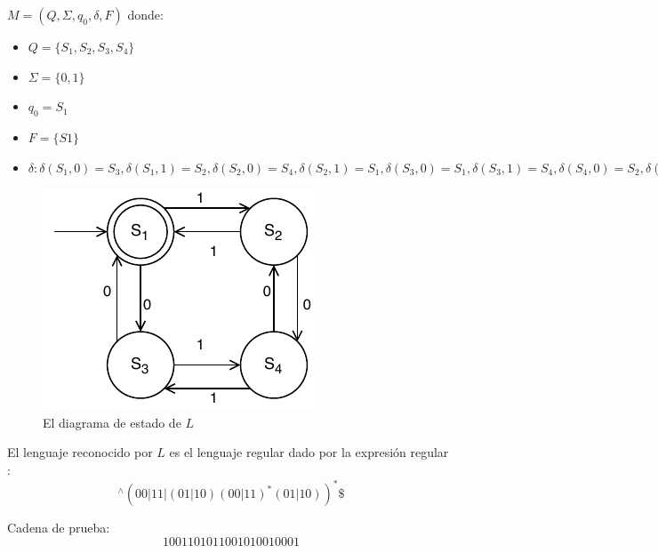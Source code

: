 $M = (Q, \Sigma, q_{0}, \delta, F)$ donde:
\begin{itemize}
	\item $Q = \{S_1, S_2, S_3, S_4 \}$
	\item $\Sigma = \{ 0, 1 \}$
	\item $q_0 = S_1$
	\item $F = \{ S1 \}$
	\item $\delta:  
			\delta(S_1, 0) = S_3, 
			\delta(S_1, 1) = S_2,
			\delta(S_2, 0) = S_4,
			\delta(S_2, 1) = S_1,
			\delta(S_3, 0) = S_1,
			\delta(S_3, 1) = S_4,
			\delta(S_4, 0) = S_2,
			\delta(S_4, 1) = S_3
		$
\end{itemize}

\begin{figure}[H]
	\centering
	\includegraphics[width=0.4\linewidth]{doc/FiniteAutomaton/img/AFD}
	\caption{El diagrama de estado de $L$}
	\label{fig:AFD}
\end{figure}

El lenguaje reconocido por $L$ es el lenguaje regular dado por la expresión regular \cite{misc:Biegeleisen2015}: 
$$
^\wedge(00|11|(01|10)(00|11)^\ast(01|10))^\ast \$
$$

Cadena de prueba:
$$
1001101011001010010001
$$

